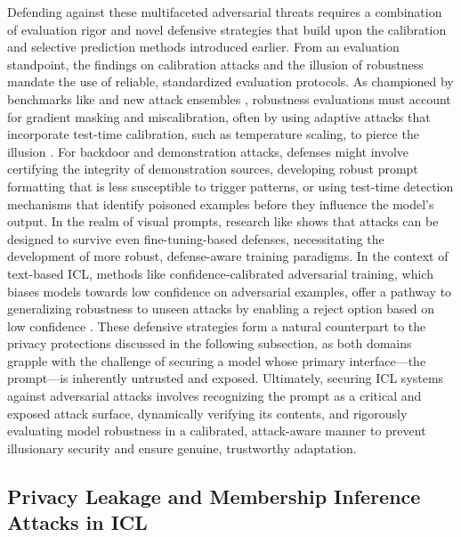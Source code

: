 \documentclass[11pt]{article}
\begin{document}
Defending against these multifaceted adversarial threats requires a combination of evaluation rigor and novel defensive strategies that build upon the calibration and selective prediction methods introduced earlier. From an evaluation standpoint, the findings on calibration attacks and the illusion of robustness mandate the use of reliable, standardized evaluation protocols. As championed by benchmarks like \cite{ref433} and new attack ensembles \cite{ref434}, robustness evaluations must account for gradient masking and miscalibration, often by using adaptive attacks that incorporate test-time calibration, such as temperature scaling, to pierce the illusion \cite{ref431}. For backdoor and demonstration attacks, defenses might involve certifying the integrity of demonstration sources, developing robust prompt formatting that is less susceptible to trigger patterns, or using test-time detection mechanisms that identify poisoned examples before they influence the model's output. In the realm of visual prompts, research like \cite{ref435} shows that attacks can be designed to survive even fine-tuning-based defenses, necessitating the development of more robust, defense-aware training paradigms. In the context of text-based ICL, methods like confidence-calibrated adversarial training, which biases models towards low confidence on adversarial examples, offer a pathway to generalizing robustness to unseen attacks by enabling a reject option based on low confidence \cite{ref436}. These defensive strategies form a natural counterpart to the privacy protections discussed in the following subsection, as both domains grapple with the challenge of securing a model whose primary interface---the prompt---is inherently untrusted and exposed. Ultimately, securing ICL systems against adversarial attacks involves recognizing the prompt as a critical and exposed attack surface, dynamically verifying its contents, and rigorously evaluating model robustness in a calibrated, attack-aware manner to prevent illusionary security and ensure genuine, trustworthy adaptation.

\subsection{Privacy Leakage and Membership Inference Attacks in ICL}
\end{document}
